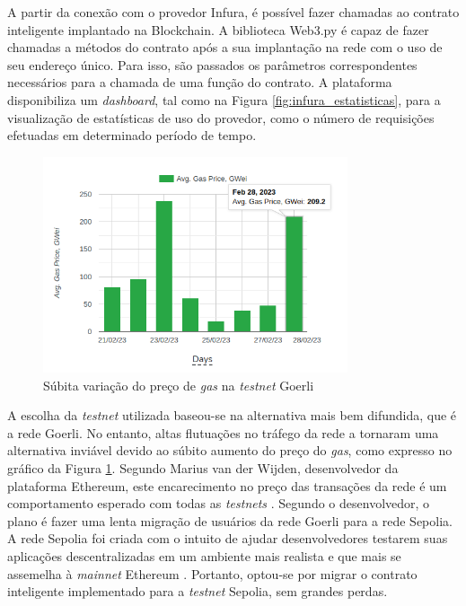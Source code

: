 A partir da conexão com o provedor Infura, é possível fazer chamadas ao contrato inteligente implantado na Blockchain. A biblioteca Web3.py é capaz de fazer chamadas a métodos do contrato após a sua implantação na rede com o uso de seu endereço único. Para isso, são passados os parâmetros correspondentes necessários para a chamada de uma função do contrato. A plataforma disponibiliza um \emph{dashboard}, tal como na Figura \ref{fig:infura_estatisticas}, para a visualização de estatísticas de uso do provedor, como o número de requisições efetuadas em determinado período de tempo.

\begin{figure}
\centering
    \includegraphics[width=0.8\textwidth]{img/Cap3/blockchain/goerli gas.png}
    \caption{Súbita variação do preço de \emph{gas} na \emph{testnet} Goerli \cite{Bitquery}}
    \label{fig:goerli_gas}
\end{figure}
A escolha da \emph{testnet} utilizada baseou-se na alternativa mais bem difundida, que é a rede Goerli. No entanto, altas flutuações no tráfego da rede a tornaram uma alternativa inviável devido ao súbito aumento do preço do \emph{gas}, como expresso no gráfico da Figura \ref{fig:goerli_gas}. Segundo Marius van der Wijden, desenvolvedor da plataforma Ethereum, este encarecimento no preço das transações da rede é um comportamento esperado com todas as \emph{testnets} \cite{kelly_2023}. Segundo o desenvolvedor, o plano é fazer uma lenta migração de usuários da rede Goerli para a rede Sepolia. A rede Sepolia foi criada com o intuito de ajudar desenvolvedores testarem suas aplicações descentralizadas em um ambiente mais realista e que mais se assemelha à \emph{mainnet} Ethereum \cite{porcelli_2023}. Portanto, optou-se por migrar o contrato inteligente implementado para a \emph{testnet} Sepolia, sem grandes perdas. 



